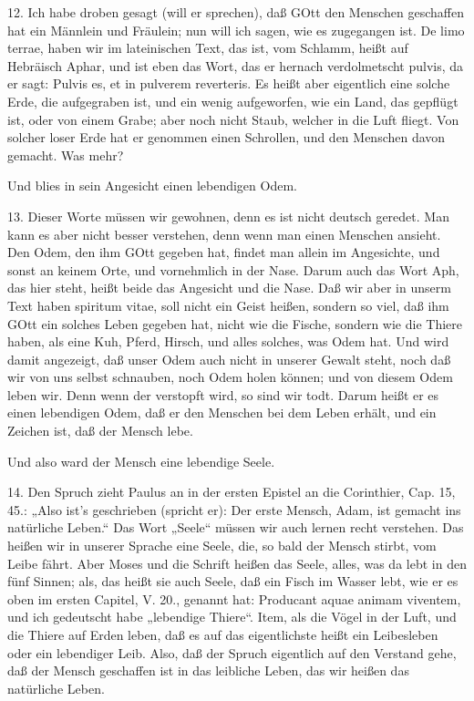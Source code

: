 12. Ich habe droben gesagt (will er sprechen), daß GOtt den Menschen geschaffen hat ein Männlein und Fräulein; nun will ich sagen, wie es zugegangen ist. De limo terrae, haben wir im lateinischen Text, das ist, vom Schlamm, heißt auf Hebräisch Aphar, und ist eben das Wort, das er hernach verdolmetscht pulvis, da er sagt: Pulvis es, et in pulverem reverteris. Es heißt aber eigentlich eine solche Erde, die aufgegraben ist, und ein wenig aufgeworfen, wie ein Land, das gepflügt ist, oder von einem Grabe; aber noch nicht Staub, welcher in die Luft fliegt. Von solcher loser Erde hat er genommen einen Schrollen, und den Menschen davon gemacht. Was mehr?

\begin{schriftzitat}
Und blies in sein Angesicht einen lebendigen Odem.
\end{schriftzitat}

13. Dieser Worte müssen wir gewohnen, denn es ist nicht deutsch geredet. Man kann es aber nicht besser verstehen, denn wenn man einen Menschen ansieht. Den Odem, den ihm GOtt gegeben hat, findet man allein im Angesichte, und sonst an keinem Orte, und vornehmlich in der Nase. Darum auch das Wort Aph, das hier steht, heißt beide das Angesicht und die Nase. Daß wir aber in unserm Text haben spiritum vitae, soll nicht ein Geist heißen, sondern so viel, daß ihm GOtt ein solches Leben gegeben hat, nicht wie die Fische, sondern wie die Thiere haben, als eine Kuh, Pferd, Hirsch, und alles solches, was Odem hat. Und wird damit angezeigt, daß unser Odem auch nicht in unserer Gewalt steht, noch daß wir von uns selbst schnauben, noch Odem holen können; und von diesem Odem leben wir. Denn wenn der verstopft wird, so sind wir todt. Darum heißt er es einen lebendigen Odem, daß er den Menschen bei dem Leben erhält, und ein Zeichen ist, daß der Mensch lebe.

\begin{schriftzitat}
Und also ward der Mensch eine lebendige Seele.
\end{schriftzitat}

14. Den Spruch zieht Paulus an in der ersten Epistel an die Corinthier, Cap. 15, 45.: „Also
ist's geschrieben (spricht er): Der erste Mensch, Adam, ist gemacht ins natürliche Leben.“ Das Wort „Seele“ müssen wir auch lernen recht verstehen. Das heißen wir in unserer Sprache eine Seele, die, so bald der Mensch stirbt, vom Leibe fährt. Aber Moses und die Schrift heißen das Seele, alles, was da lebt in den fünf Sinnen; als, das heißt sie auch Seele, daß ein Fisch im Wasser lebt, wie er es oben im ersten Capitel, V. 20., genannt hat: Producant aquae animam viventem, und ich gedeutscht habe „lebendige Thiere“. Item, als die Vögel in der Luft, und die Thiere auf Erden leben, daß es auf das eigentlichste heißt ein Leibesleben oder ein lebendiger Leib. Also, daß der Spruch eigentlich auf den Verstand gehe, daß der Mensch geschaffen ist in das leibliche Leben, das wir heißen das natürliche Leben.

